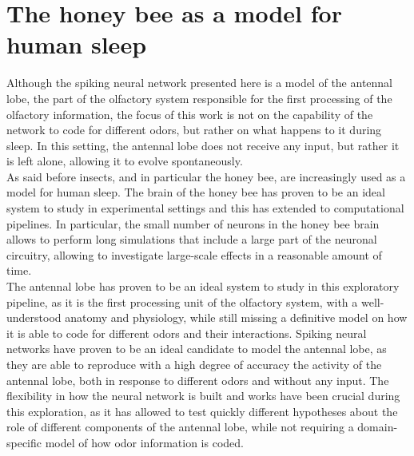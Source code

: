\section{The honey bee as a model for human sleep}
Although the spiking neural network presented here is a model of the antennal lobe, the part of the olfactory system responsible for the first processing of the olfactory information, the focus of this work is not on the capability of the network to code for different odors, but rather on what happens to it during sleep.
In this setting, the antennal lobe does not receive any input, but rather it is left alone, allowing it to evolve spontaneously.\\
As said before insects, and in particular the honey bee, are increasingly used as a model for human sleep.
The brain of the honey bee has proven to be an ideal system to study in experimental settings and this has extended to computational pipelines.
In particular, the small number of neurons in the honey bee brain allows to perform long simulations that include a large part of the neuronal circuitry, allowing to investigate large-scale effects in a reasonable amount of time.\\
The antennal lobe has proven to be an ideal system to study in this exploratory pipeline, as it is the first processing unit of the olfactory system, with a well-understood anatomy and physiology, while still missing a definitive model on how it is able to code for different odors and their interactions.
Spiking neural networks have proven to be an ideal candidate to model the antennal lobe, as they are able to reproduce with a high degree of accuracy the activity of the antennal lobe, both in response to different odors and without any input.
The flexibility in how the neural network is built and works have been crucial during this exploration, as it has allowed to test quickly different hypotheses about the role of different components of the antennal lobe, while not requiring a domain-specific model of how odor information is coded.\\

